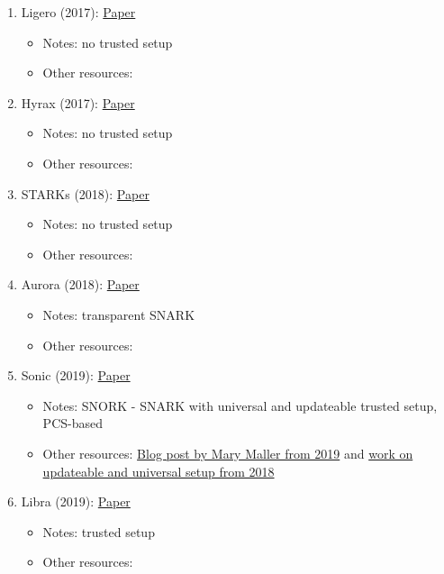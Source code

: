 {\begin{enumerate}
	\item Ligero (2017): \href{https://acmccs.github.io/papers/p2087-amesA.pdf}{Paper}
	\begin{itemize}[label={--}]
		\item Notes: no trusted setup
		\item Other resources: 
	\end{itemize}

	\item Hyrax (2017): \href{https://eprint.iacr.org/2017/1132.pdf}{Paper}
	\begin{itemize}[label={--}]
		\item Notes: no trusted setup
		\item Other resources: 
	\end{itemize}

	\item STARKs (2018): \href{https://eprint.iacr.org/2018/046.pdf}{Paper}
	\begin{itemize}[label={--}]
		\item Notes: no trusted setup 
		\item Other resources: 
	\end{itemize}

	\item Aurora (2018): \href{https://eprint.iacr.org/2018/828.pdf}{Paper}
	\begin{itemize}[label={--}]
		\item Notes: transparent SNARK
		\item Other resources:
	\end{itemize}

	\item Sonic (2019): \href{https://eprint.iacr.org/2019/099.pdf}{Paper}
	\begin{itemize}[label={--}]
		\item Notes: SNORK - SNARK with universal and updateable trusted setup, PCS-based
		\item Other resources: \href{https://www.benthamsgaze.org/2019/02/07/introducing-sonic-a-practical-zk-snark-with-a-nearly-trustless-setup/}{Blog post by Mary Maller from 2019} and \href{https://eprint.iacr.org/2018/280}{work on updateable and universal setup from 2018}
	\end{itemize}

	\item Libra (2019): \href{https://eprint.iacr.org/2019/317}{Paper}
	\begin{itemize}[label={--}]
		\item Notes: trusted setup
		\item Other resources:
	\end{itemize}


\end{enumerate}}
